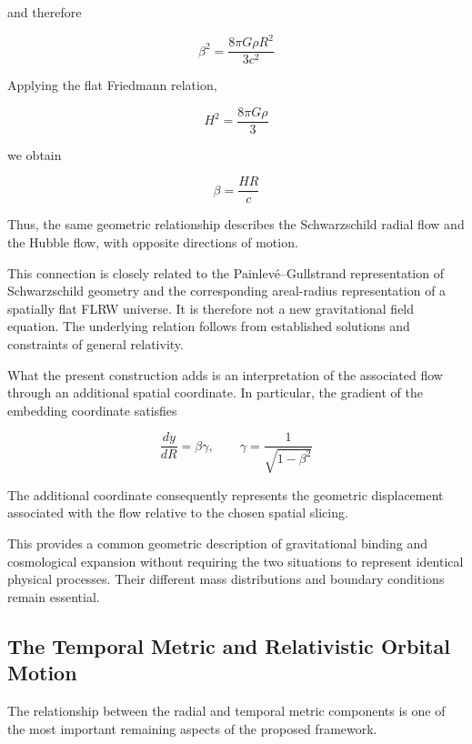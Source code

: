 \documentclass[pdflatex,sn-mathphys-num]{sn-jnl}%
\theoremstyle{thmstyleone}%
\theoremstyle{thmstyletwo}%
\theoremstyle{thmstylethree}%
\begin{document}
and therefore

\begin{equation}
    \beta^2
    =
    \frac{8\pi G\rho R^2}{3c^2}
\end{equation}

Applying the flat Friedmann relation,

\begin{equation}
    H^2
    =
    \frac{8\pi G\rho}{3}
\end{equation}

we obtain

\begin{equation}
    \beta
    =
    \frac{HR}{c}
\end{equation}

Thus, the same geometric relationship describes the Schwarzschild radial flow and the Hubble flow, with opposite directions of motion.

This connection is closely related to the Painlev\'e--Gullstrand representation of Schwarzschild geometry and the corresponding areal-radius representation of a spatially flat FLRW universe. It is therefore not a new gravitational field equation. The underlying relation follows from established solutions and constraints of general relativity.

What the present construction adds is an interpretation of the associated flow through an additional spatial coordinate. In particular, the gradient of the embedding coordinate satisfies

\begin{equation}
    \frac{dy}{dR}
    =
    \beta\gamma,
    \qquad
    \gamma
    =
    \frac{1}{\sqrt{1-\beta^2}}
\end{equation}

The additional coordinate consequently represents the geometric displacement associated with the flow relative to the chosen spatial slicing.

This provides a common geometric description of gravitational binding and cosmological expansion without requiring the two situations to represent identical physical processes. Their different mass distributions and boundary conditions remain essential.

\subsection{The Temporal Metric and Relativistic Orbital Motion}

The relationship between the radial and temporal metric components is one of the most important remaining aspects of the proposed framework.
\end{document}
